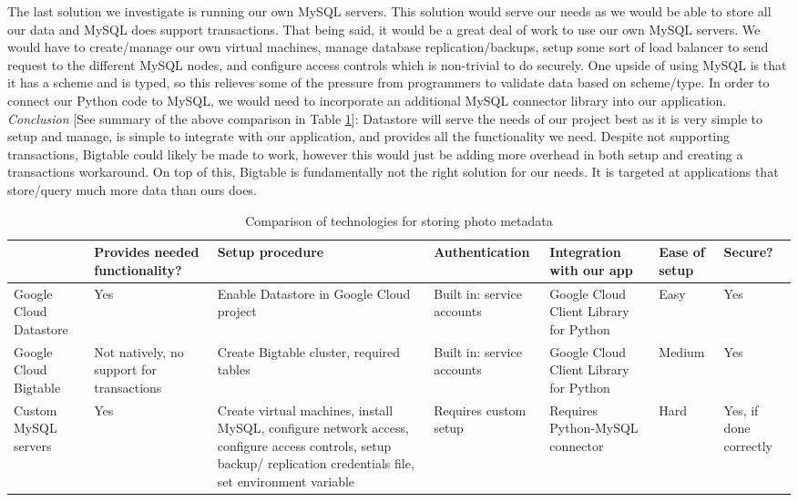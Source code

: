 \documentclass[10pt, onecolumn, draftclsnofoot, letterpaper, compsoc]{IEEEtran}
\begin{document}
The last solution we investigate is running our own MySQL servers. This solution
would serve our needs as we would be able to store all our data and MySQL
does support transactions. That being said, it would be a great deal of work to
use our own MySQL servers. We would have to create/manage our own virtual machines,
manage database replication/backups, setup some sort of load balancer to send
request to the different MySQL nodes, and configure access controls which is
non-trivial to do securely. One upside of using MySQL is that it has a scheme
and is typed, so this relieves some of the pressure from programmers to
validate data based on scheme/type. In order to connect our Python code to MySQL,
we would need to incorporate an additional MySQL connector library into our
application\cite{mysql}. \\

\textit{Conclusion} [See summary of the above comparison in Table \ref{table:bret2}]:
Datastore will serve the needs of our project best as it is
very simple to setup and manage, is simple to integrate with our application,
and provides all the functionality we need. Despite not supporting transactions,
Bigtable could likely be made to work, however this would just be adding more
overhead in both setup and creating a transactions workaround. On top of this,
Bigtable is fundamentally not the right solution for our needs. It is
targeted at applications that store/query much more data than ours does. \\

\begin{table}[h]
\centering
\caption{Comparison of technologies for storing photo metadata}
\begin{tabular}{|p{1.8cm}|p{1.4cm}|p{3cm}|p{1.8cm}|p{1.8cm}|p{1.8cm}|p{1cm}|}
\cline{4-4}
\hline

 & Provides needed functionality? & Setup procedure & Authentication
 & Integration with our app & Ease of setup & Secure? \\ \hline

Google Cloud Datastore & Yes & Enable Datastore in Google Cloud project
& Built in: service accounts & Google Cloud Client Library for Python
& Easy & Yes \\ \hline

Google Cloud Bigtable & Not natively, no support for transactions &
Create Bigtable cluster, required tables & Built in: service accounts
& Google Cloud Client Library for Python & Medium & Yes \\ \hline

Custom MySQL servers & Yes & Create virtual machines, install MySQL,
configure network access, configure access controls, setup backup/
replication credentials file, set environment variable & Requires custom setup
& Requires Python-MySQL connector & Hard & Yes, if done correctly \\ \hline

\end{tabular}
\label{table:bret2}
\end{table}
\end{document}
